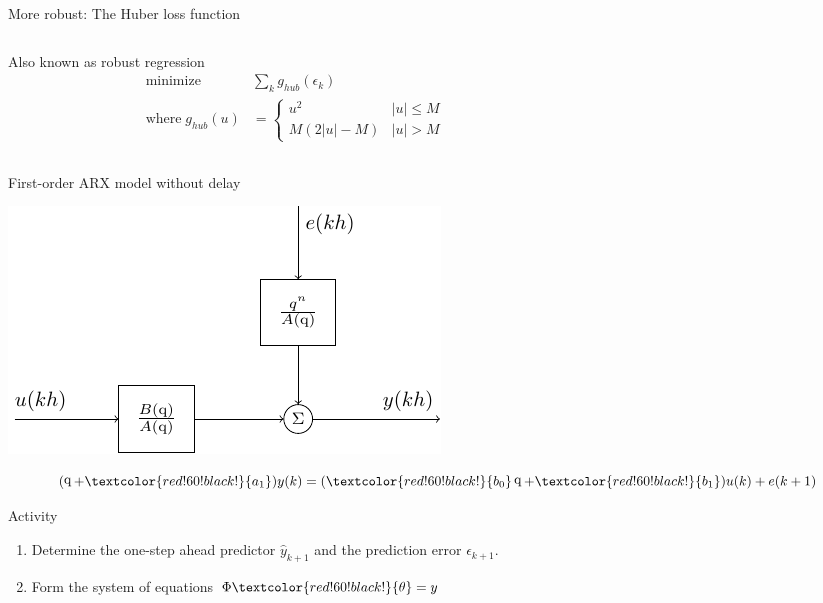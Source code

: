 \documentclass[presentation,aspectratio=169]{beamer}
\DeclareMathOperator{\shift}{q}
\begin{document}
\begin{frame}[label={sec:org86ffe3a}]{More robust: The Huber loss function}
\begin{columns}
\begin{column}{0.4\columnwidth}
Also known as \alert{robust regression}
\begin{align*}
 \text{minimize} \; &\sum_k g_{hub}(\epsilon_k)\\
 \text{where}\; g_{hub}(u) &= \begin{cases} u^2 & |u| \le M\\ M(2|u|-M) & |u| > M \end{cases}
\end{align*}
\end{column}

\begin{column}{0.6\columnwidth}
\begin{center}
\end{center}
\end{column}
\end{columns}
\end{frame}


\begin{frame}[label={sec:orgf1667be}]{First-order ARX model without delay}
\begin{center}
\includegraphics[width=0.4\linewidth]{../../figures/block-arx}
\end{center}
\[ (\shift + \textcolor{red!60!black!}{a_1}) y(k) = (\textcolor{red!60!black!}{b_0} \shift + \textcolor{red!60!black!}{b_1}) u(k) + e(k+1) \]

\alert{Activity}

\begin{enumerate}
\item Determine the one-step ahead predictor \(\hat{y}_{k+1}\) and the prediction error \(\epsilon_{k+1}\).
\item Form the system of equations \(\Phi\textcolor{red!60!black!}{\theta} = y\)
\end{enumerate}
\end{frame}
\end{document}
